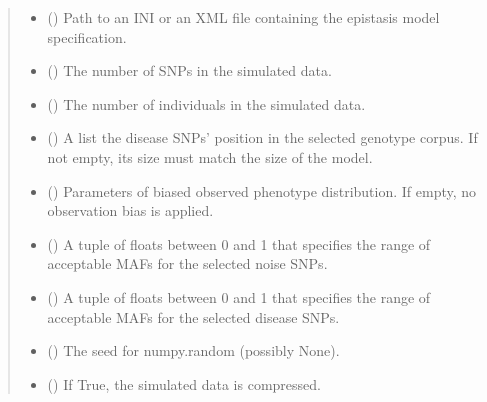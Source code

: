 \documentclass[a4paper,10pt,english]{sphinxhowto}
\begin{document}
\begin{fulllineitems}
\begin{fulllineitems}
\begin{quote}
\begin{description}
\begin{itemize}
\item {} 
 () \textendash{} Path to an INI or an XML file containing the epistasis model specification.

\item {} 
 () \textendash{} The number of SNPs in the simulated data.

\item {} 
 () \textendash{} The number of individuals in the simulated data.

\item {} 
 () \textendash{} A list the disease SNPs’ position in the selected genotype corpus. If not empty, its size must match the size of the model.

\item {} 
 () \textendash{} Parameters of biased observed phenotype distribution. If empty, no observation bias is applied.

\item {} 
 (\sphinxstyleliteralemphasis{\sphinxupquote{,}}) \textendash{} A tuple of floats between 0 and 1 that specifies the range of acceptable MAFs for the selected noise SNPs.

\item {} 
 (\sphinxstyleliteralemphasis{\sphinxupquote{,}}) \textendash{} A tuple of floats between 0 and 1 that specifies the range of acceptable MAFs for the selected disease SNPs.

\item {} 
 () \textendash{} The seed for numpy.random (possibly None).

\item {} 
 () \textendash{} If True, the simulated data is compressed.


\end{itemize}
\end{description}
\end{quote}
\end{fulllineitems}
\end{fulllineitems}
\end{document}
